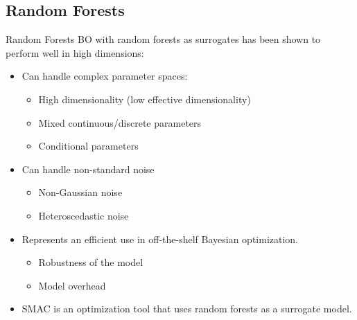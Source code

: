 \subsection{Random Forests}
\begin{frame}{Random Forests}
BO with random forests as surrogates has been shown to perform well in high dimensions:
\begin{itemize}
    \item Can handle complex parameter spaces:
    \pause
    \begin{itemize}
        \item High dimensionality (low effective dimensionality)
        \pause
        \item Mixed continuous/discrete parameters
        \pause
        \item Conditional parameters
        \pause
    \end{itemize}
    \item Can handle non-standard noise
    \pause
    \begin{itemize}
        \item Non-Gaussian noise
        \pause
        \item Heteroscedastic noise
        \pause
    \end{itemize}
    \item Represents an efficient use in off-the-shelf Bayesian optimization.
    \pause
    \begin{itemize}
        \item Robustness of the model
        \pause
        \item Model overhead
    \end{itemize}
    \item SMAC is an optimization tool that uses random forests as a surrogate model.
\end{itemize}
\end{frame}




